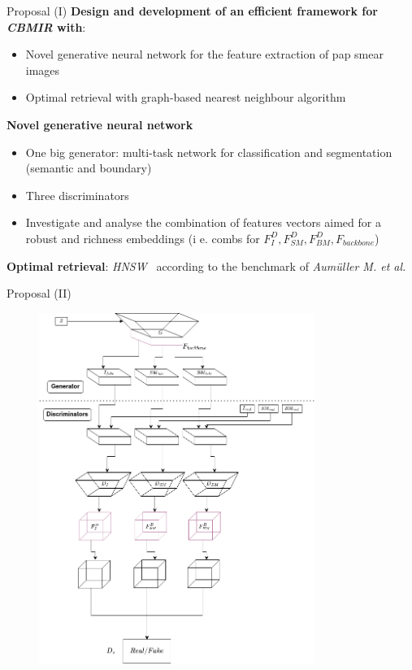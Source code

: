 \documentclass[xcolor=dvipsnames]{beamer}
\begin{document}
    \begin{frame}{Proposal (I)}
    \textbf{Design and development of an efficient framework for \textit{CBMIR} with}:

    \begin{itemize}
        \item Novel generative neural network for the feature extraction of pap smear images
        \item Optimal retrieval with graph-based nearest neighbour algorithm
    \end{itemize}

    \textbf{Novel generative neural network}
    \begin{itemize}
        \item One big generator: multi-task network for classification and segmentation (semantic and boundary)
        \item Three discriminators
        \item Investigate and analyse the combination of features vectors aimed for a robust and richness embeddings (i e. combs for $F_{I}^{D},F_{SM}^{D},F_{BM}^{D}, F_{backbone}$)
    \end{itemize}

    \textbf{Optimal retrieval}: \textit{HNSW}~\cite{Malkov2016EfficientAR, Boytsov2013EngineeringEA} according to the benchmark of \textit{Aumüller M. et al.}~\cite{10.48550/arxiv.1807.05614}
    
    \end{frame}

    \begin{frame}{Proposal (II)}
        \begin{figure}
        \centering
        \includegraphics[width=0.8\textwidth]{img/arq-prop.png}
        \end{figure}
    \end{frame}
\end{document}
